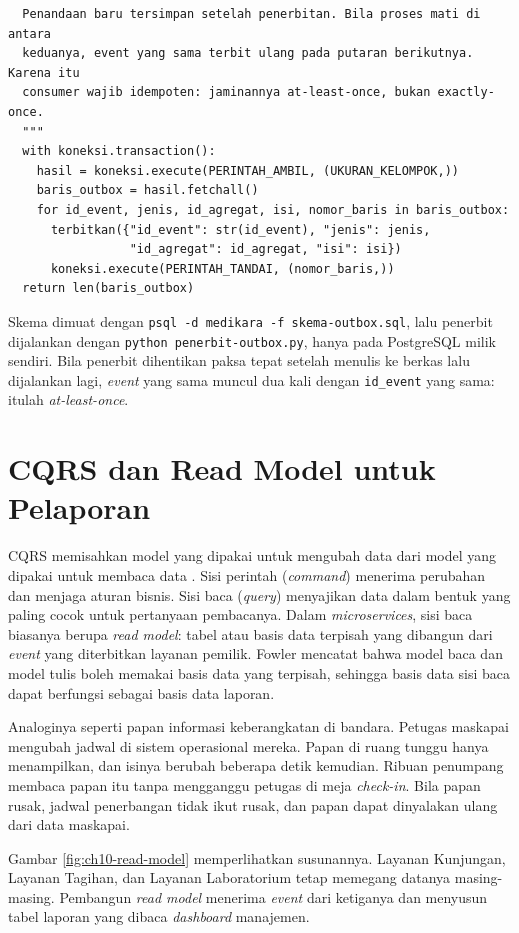 \begin{pendalaman}[title={Pendalaman Teknis (opsional): Outbox Sederhana dengan PostgreSQL}]
\begin{lstlisting}
  Penandaan baru tersimpan setelah penerbitan. Bila proses mati di antara
  keduanya, event yang sama terbit ulang pada putaran berikutnya. Karena itu
  consumer wajib idempoten: jaminannya at-least-once, bukan exactly-once.
  """
  with koneksi.transaction():
    hasil = koneksi.execute(PERINTAH_AMBIL, (UKURAN_KELOMPOK,))
    baris_outbox = hasil.fetchall()
    for id_event, jenis, id_agregat, isi, nomor_baris in baris_outbox:
      terbitkan({"id_event": str(id_event), "jenis": jenis,
                 "id_agregat": id_agregat, "isi": isi})
      koneksi.execute(PERINTAH_TANDAI, (nomor_baris,))
  return len(baris_outbox)
\end{lstlisting}

  Skema dimuat dengan \texttt{psql -d medikara -f skema-outbox.sql}, lalu penerbit dijalankan
  dengan \texttt{python penerbit-outbox.py}, hanya pada PostgreSQL milik sendiri. Bila penerbit
  dihentikan paksa tepat setelah menulis ke berkas lalu dijalankan lagi, \textit{event} yang sama
  muncul dua kali dengan \texttt{id\_event} yang sama: itulah \textit{at-least-once}.
\end{pendalaman}

\section{CQRS dan Read Model untuk Pelaporan}
\label{sec:ch10-cqrs}

CQRS memisahkan model yang dipakai untuk mengubah data dari model yang dipakai untuk membaca data
\cite{c10-fowler-cqrs}. Sisi perintah (\textit{command}) menerima perubahan dan menjaga aturan
bisnis. Sisi baca (\textit{query}) menyajikan data dalam bentuk yang paling cocok untuk pertanyaan
pembacanya. Dalam \textit{microservices}, sisi baca biasanya berupa \textit{read model}: tabel atau
basis data terpisah yang dibangun dari \textit{event} yang diterbitkan layanan pemilik. Fowler
mencatat bahwa model baca dan model tulis boleh memakai basis data yang terpisah, sehingga basis
data sisi baca dapat berfungsi sebagai basis data laporan.

Analoginya seperti papan informasi keberangkatan di bandara. Petugas maskapai mengubah jadwal di
sistem operasional mereka. Papan di ruang tunggu hanya menampilkan, dan isinya berubah beberapa
detik kemudian. Ribuan penumpang membaca papan itu tanpa mengganggu petugas di meja
\textit{check-in}. Bila papan rusak, jadwal penerbangan tidak ikut rusak, dan papan dapat dinyalakan
ulang dari data maskapai.

Gambar \ref{fig:ch10-read-model} memperlihatkan susunannya. Layanan Kunjungan, Layanan Tagihan, dan
Layanan Laboratorium tetap memegang datanya masing-masing. Pembangun \textit{read model} menerima
\textit{event} dari ketiganya dan menyusun tabel laporan yang dibaca \textit{dashboard} manajemen.


